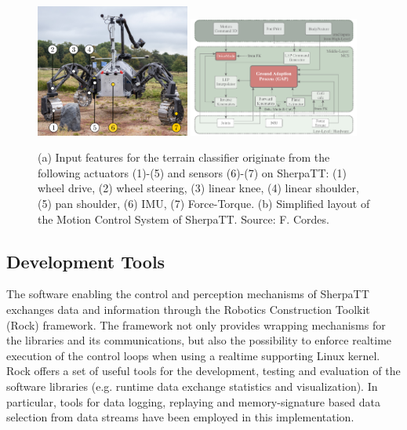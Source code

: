 \documentclass{article}
\begin{document}
\begin{figure}[!htb]
       {
           \includegraphics[width=0.45\textwidth]{../figures/terrain_classifier_sensor_inputs.png}
       }
       {
           \includegraphics[width=0.5\textwidth]{../figures/MCS-Structure.pdf}
       }
   \caption{\label{fig:Loco}(a) Input features for the terrain classifier originate from the following actuators (1)-(5) and sensors (6)-(7) on SherpaTT: (1) wheel drive, (2) wheel steering, (3) linear knee, (4) linear shoulder, (5) pan shoulder, (6) IMU, (7) Force-Torque. (b) Simplified layout of the Motion Control System of SherpaTT. Source: F. Cordes.}
\end{figure}


\subsection{Development Tools}

The software enabling the control and perception mechanisms of SherpaTT exchanges data and information through the Robotics Construction Toolkit (Rock) framework. 
The framework not only provides wrapping mechanisms for the libraries and its communications, but also the possibility to enforce realtime execution of the control loops when using a realtime supporting Linux kernel. 
Rock offers a set of useful tools for the development, testing and evaluation of the software libraries (e.g. runtime data exchange statistics and visualization). 
In particular, tools for data logging, replaying and memory-signature based data selection from data streams have been employed in this implementation. 
\end{document}
